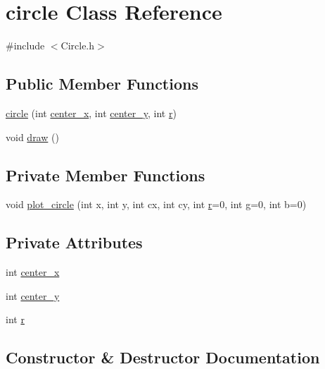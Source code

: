 \hypertarget{classcircle}{}\section{circle Class Reference}
\label{classcircle}


{\ttfamily \#include $<$Circle.\+h$>$}

\subsection*{Public Member Functions}
\begin{DoxyCompactItemize}
\item 
\hyperlink{classcircle_a05447431f708a932321cf140f36e45be}{circle} (int \hyperlink{classcircle_acb3d4e48483b2ea9837fa75cc0977c0d}{center\+\_\+x}, int \hyperlink{classcircle_ae297efc5c3c3b7a2e6595ed74e324c88}{center\+\_\+y}, int \hyperlink{classcircle_a90f36ddf730f3c068125f9533d1cd7a1}{r})
\item 
void \hyperlink{classcircle_ab64f82d19bb3a5318d1b94bf9946b732}{draw} ()
\end{DoxyCompactItemize}
\subsection*{Private Member Functions}
\begin{DoxyCompactItemize}
\item 
void \hyperlink{classcircle_a2a17a7069348f990b854b7e6d7cef358}{plot\+\_\+circle} (int x, int y, int cx, int cy, int \hyperlink{classcircle_a90f36ddf730f3c068125f9533d1cd7a1}{r}=0, int g=0, int b=0)
\end{DoxyCompactItemize}
\subsection*{Private Attributes}
\begin{DoxyCompactItemize}
\item 
int \hyperlink{classcircle_acb3d4e48483b2ea9837fa75cc0977c0d}{center\+\_\+x}
\item 
int \hyperlink{classcircle_ae297efc5c3c3b7a2e6595ed74e324c88}{center\+\_\+y}
\item 
int \hyperlink{classcircle_a90f36ddf730f3c068125f9533d1cd7a1}{r}
\end{DoxyCompactItemize}


\subsection{Constructor \& Destructor Documentation}
\mbox{\label{classcircle_a05447431f708a932321cf140f36e45be}} 
